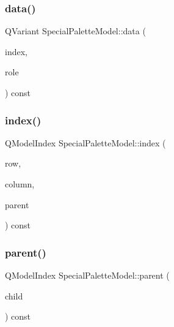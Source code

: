 \subsubsection{\texorpdfstring{data()}{data()}}
{\footnotesize\ttfamily Q\+Variant Special\+Palette\+Model\+::data (\begin{DoxyParamCaption}\item[{const Q\+Model\+Index \&}]{index,  }\item[{int}]{role }\end{DoxyParamCaption}) const\hspace{0.3cm}{\ttfamily [inline]}}

\mbox{\label{class_special_palette_model_a94fc1673a8a051df110aa0a60414269a}} 
\subsubsection{\texorpdfstring{index()}{index()}}
{\footnotesize\ttfamily Q\+Model\+Index Special\+Palette\+Model\+::index (\begin{DoxyParamCaption}\item[{int}]{row,  }\item[{int}]{column,  }\item[{const Q\+Model\+Index \&}]{parent }\end{DoxyParamCaption}) const\hspace{0.3cm}{\ttfamily [inline]}}

\mbox{\label{class_special_palette_model_ac2f39fe05f07467200958bb107464273}} 
\subsubsection{\texorpdfstring{parent()}{parent()}}
{\footnotesize\ttfamily Q\+Model\+Index Special\+Palette\+Model\+::parent (\begin{DoxyParamCaption}\item[{const Q\+Model\+Index \&}]{child }\end{DoxyParamCaption}) const\hspace{0.3cm}{\ttfamily [inline]}}

\mbox{\label{class_special_palette_model_af10e3bdd46f5a73218cdecf54a27f714}} 
